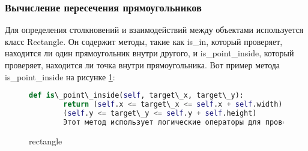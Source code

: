 \subsubsection{Вычисление пересечения прямоугольников}
Для определения столкновений и взаимодействий между объектами используется класс Rectangle. Он содержит методы, такие как is\_in, который проверяет, находится ли один прямоугольник внутри другого, и is\_point\_inside, который проверяет, находится ли точка внутри прямоугольника. Вот пример метода is\_point\_inside на рисунке \ref{tttk:image}:
\begin{figure}[H]
	\begin{lstlisting}[language=Python]
		def is\_point\_inside(self, target\_x, target\_y):
		return (self.x <= target\_x <= self.x + self.width) and
		(self.y <= target\_y <= self.y + self.height)
		Этот метод использует логические операторы для проверки, находится ли точка (target\_x, target\_y) в пределах прямоугольника, определенного координатами (x, y) и размерами (width, height).
\end{lstlisting}  
\caption{rectangle}
\label{tttk:image}
\end{figure}

